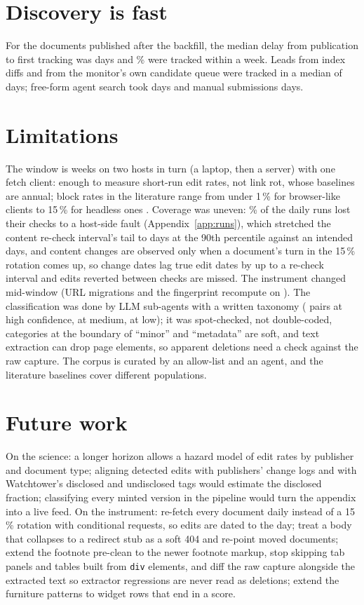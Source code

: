 \documentclass[10pt,a4paper]{article}
\begin{document}
\section{Discovery is fast}
For the \nLagLive{} documents published after the backfill, the median delay from publication to first
tracking was \lagMedianDays{} days and \lagWithinSevenDays\% were tracked within a week. Leads from index
diffs and from the monitor's own candidate queue were tracked in a median of
\lagLeadFastRange{} days; free-form agent search took \lagLeadAgentSearch{} days and manual submissions
\lagLeadManual{} days.

\section{Limitations}
The window is \trackingWeeks{} weeks on two hosts in turn (a laptop, then a server) with one fetch client: enough to measure short-run edit
rates, not link rot, whose baselines are annual; block rates in the literature range from under 1\,\% for
browser-like clients to 15\,\% for headless ones \cite{gundelach2026}. Coverage was uneven: \shareOutageRuns\%
of the daily runs lost their checks to a host-side fault (Appendix~\ref{app:runs}), which stretched the content
re-check interval's tail to \fpGapPNineZeroDays{} days at the 90th percentile against an intended
\fpIntendedGapDays{} days, and content changes are observed only when a document's turn in the 15\,\% rotation comes
up, so change dates lag true edit dates by up to a re-check interval and edits reverted between checks are
missed. The instrument changed mid-window (URL migrations and the fingerprint recompute on
\filterRecomputePretty). The classification was done by LLM sub-agents with a written taxonomy (\nConfHigh{}
pairs at high confidence, \nConfMedium{} at medium, \nConfLow{} at low); it was spot-checked, not double-coded, categories at the
boundary of ``minor'' and ``metadata'' are soft, and text extraction can drop page elements, so apparent
deletions need a check against the raw capture. The corpus is curated by an allow-list and an agent, and the
literature baselines cover different populations.

\section{Future work}
On the science: a longer horizon allows a hazard model of edit rates by publisher and document type;
aligning detected edits with publishers' change logs and with Watchtower's disclosed and undisclosed tags
would estimate the disclosed fraction; classifying every minted version in the pipeline would turn the
appendix into a live feed. On the instrument: re-fetch every document daily instead of a 15\,\% rotation
with conditional requests, so edits are dated to the
day; treat a body that collapses to a redirect stub as a soft 404 and re-point moved documents; extend the footnote
pre-clean to the newer footnote markup, stop skipping tab panels and tables built from \texttt{div} elements, and diff the raw capture alongside the extracted text so extractor regressions
are never read as deletions; extend the furniture patterns to widget rows that end in a
score.
\end{document}
